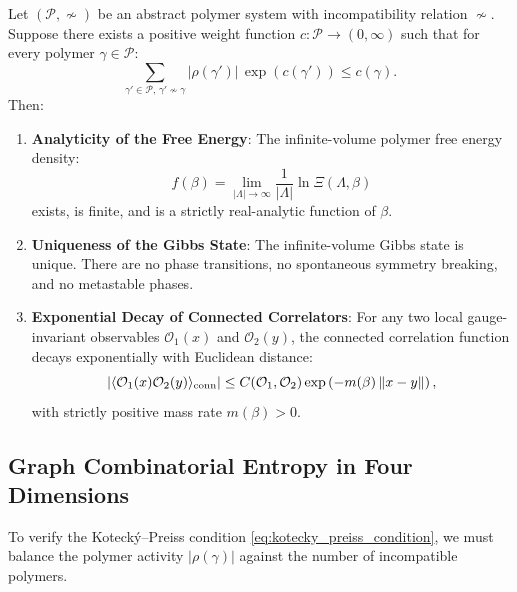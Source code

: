\begin{theorem}
\label{thm:kotecky_preiss}
Let $(\mathcal{P}, \nsim)$ be an abstract polymer system with incompatibility relation $\nsim$. Suppose there exists a positive weight function $c : \mathcal{P} \to (0, \infty)$ such that for every polymer $\gamma \in \mathcal{P}$:
\begin{equation}
\label{eq:kotecky_preiss_condition}
\sum_{\gamma' \in \mathcal{P}, \, \gamma' \nsim \gamma} \left| \rho(\gamma') \right| \, \exp\left( c(\gamma') \right) \le c(\gamma).
\end{equation}
Then:
\begin{enumerate}
    \item \textbf{Analyticity of the Free Energy}: The infinite-volume polymer free energy density:
    \begin{equation}
    \label{eq:ch13_free_energy_density}
    f(\beta) = \lim_{|\Lambda| \to \infty} \frac{1}{|\Lambda|} \ln \Xi(\Lambda, \beta)
    \end{equation}
    exists, is finite, and is a strictly real-analytic function of $\beta$.
    \item \textbf{Uniqueness of the Gibbs State}: The infinite-volume Gibbs state is unique. There are no phase transitions, no spontaneous symmetry breaking, and no metastable phases.
    \item \textbf{Exponential Decay of Connected Correlators}: For any two local gauge-invariant observables $\mathcal{O}_1(x)$ and $\mathcal{O}_2(y)$, the connected correlation function decays exponentially with Euclidean distance:
    \begin{equation}
    \label{eq:ch13_kp_exponential_decay}
    \left| \langle \mathcal{O}_1(x) \mathcal{O}_2(y) \rangle_{\mathrm{conn}} \right| \le C(\mathcal{O}_1, \mathcal{O}_2) \exp\left( -m(\beta) \, \|x - y\| \right),
    \end{equation}
    with strictly positive mass rate $m(\beta) > 0$.
\end{enumerate}
\end{theorem}

\subsection{Graph Combinatorial Entropy in Four Dimensions}
\label{subsec:graph_entropy_4d}

To verify the Koteck\'y--Preiss condition \eqref{eq:kotecky_preiss_condition}, we must balance the polymer activity $|\rho(\gamma)|$ against the number of incompatible polymers.

